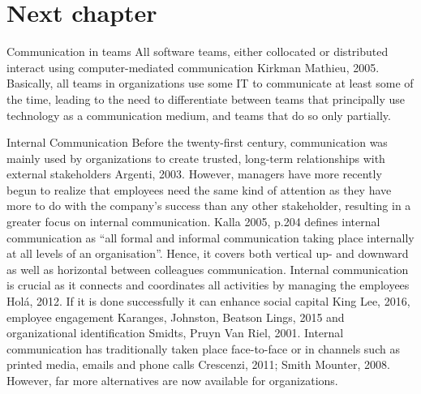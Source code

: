 \chapter{Next chapter}

Communication in teams
All software teams, either collocated or distributed interact using computer-mediated communication Kirkman  Mathieu, 2005. Basically, all teams in organizations use some IT to communicate at least some of the time, leading to the need to differentiate between teams that principally use technology as a communication medium, and teams that do so only partially.

Internal Communication 
Before the twenty-first century, communication was mainly used by organizations to create trusted, long-term relationships with external stakeholders Argenti, 2003. However, managers have more recently begun to realize that employees need the same kind of attention as they have more to do with the company’s success than any other stakeholder, resulting in a greater focus on internal communication. 
Kalla 2005, p.204 defines internal communication as “all formal and informal communication taking place internally at all levels of an organisation”. Hence, it covers both vertical up- and downward as well as horizontal between colleagues communication. Internal communication is crucial as it connects and coordinates all activities by managing the employees Holá, 2012. 
If it is done successfully it can enhance social capital King  Lee, 2016, employee engagement Karanges, Johnston, Beatson  Lings, 2015 and organizational identification Smidts, Pruyn  Van Riel, 2001. Internal communication has traditionally taken place face-to-face or in channels such as printed media, emails and phone calls Crescenzi, 2011; Smith  Mounter, 2008. However, far more alternatives are now available for organizations.

